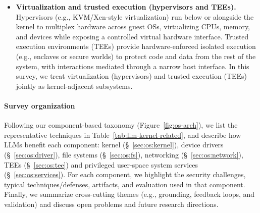 \begin{itemize}
  \item
  \textbf{Virtualization and trusted execution (hypervisors and TEEs).}
  Hypervisors (e.g., KVM/Xen-style virtualization) run below or alongside the kernel to multiplex hardware across guest OSs, virtualizing CPUs, memory, and devices while exposing a controlled virtual hardware interface.
  Trusted execution environments (TEEs) provide hardware-enforced isolated execution (e.g., enclaves or secure worlds) to protect code and data from the rest of the system, with interactions mediated through a narrow host interface.
  In this survey, we treat virtualization (hypervisors) and trusted execution (TEEs) jointly as kernel-adjacent subsystems. %

\end{itemize}



\paragraph{Survey organization}
Following our component-based taxonomy (Figure~\ref{fig:os-arch}), we list the representative techniques in Table~\ref{tab:llm-kernel-related}, and describe how LLMs benefit each component: kernel (\S~\ref{sec:os:kernel}), device drivers (\S~\ref{sec:os:driver}), file systems (\S~\ref{sec:os:fs}), networking (\S~\ref{sec:os:network}), TEEs (\S~\ref{sec:os:tee}) and privileged user-space system services (\S~\ref{sec:os:services}). 
For each component, we highlight the security challenges, typical techniques/defenses, artifacts, and evaluation used in that component. 
Finally, we summarize cross-cutting themes (e.g., grounding, feedback loops, and validation) and discuss open problems and future research directions.


